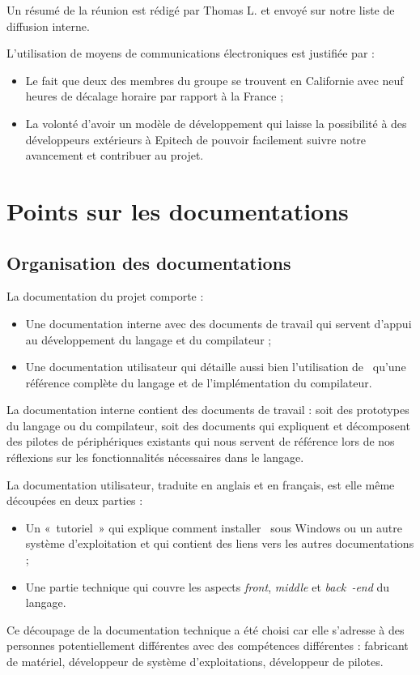 \documentclass[francais]{rtxreport}
\begin{document}
Un résumé de la réunion est rédigé par Thomas L. et envoyé sur notre liste de
diffusion interne.

L'utilisation de moyens de communications électroniques est justifiée par :
\begin{itemize}
\item Le fait que deux des membres du groupe se trouvent en Californie avec
  neuf heures de décalage horaire par rapport à la France ;
\item La volonté d'avoir un modèle de développement qui laisse la possibilité à
  des développeurs extérieurs à Epitech de pouvoir facilement suivre notre
  avancement et contribuer au projet.
\end{itemize}

\chapter{Points sur les documentations}

\section{Organisation des documentations}

La documentation du projet comporte :
\begin{itemize}
\item Une documentation interne avec des documents de travail qui servent
  d'appui au développement du langage et du compilateur ;
\item Une documentation utilisateur qui détaille aussi bien l'utilisation de
  \rtx\ qu'une référence complète du langage et de l'implémentation du
  compilateur.
\end{itemize}

La documentation interne contient des documents de travail : soit des prototypes
du langage ou du compilateur, soit des documents qui expliquent et décomposent
des pilotes de périphériques existants qui nous servent de référence lors de nos
réflexions sur les fonctionnalités nécessaires dans le langage.

La documentation utilisateur, traduite en anglais et en français, est elle même
découpées en deux parties :
\begin{itemize}
\item Un «~tutoriel~» qui explique comment installer \rtx\ sous Windows ou un
  autre système d'exploitation et qui contient des liens vers les autres
  documentations ;
\item Une partie technique qui couvre les aspects \emph{front}, \emph{middle} et
  \emph{back~-end} du langage.
\end{itemize}
Ce découpage de la documentation technique a été choisi car elle s'adresse à des
personnes potentiellement différentes avec des compétences différentes :
fabricant de matériel, développeur de système d'exploitations, développeur de
pilotes.
\end{document}
